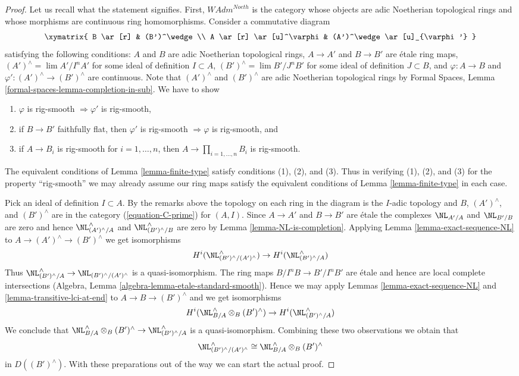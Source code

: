 \begin{proof}
Let us recall what the statement signifies. First, 
$\textit{WAdm}^{Noeth}$ is the category whose objects are
adic Noetherian topological rings and whose morphisms are
continuous ring homomorphisms. Consider a commutative diagram
$$
\xymatrix{
B \ar[r] & (B')^\wedge \\
A \ar[r] \ar[u]^\varphi & (A')^\wedge \ar[u]_{\varphi'}
}
$$
satisfying the following conditions:
$A$ and $B$ are adic Noetherian topological rings,
$A \to A'$ and $B \to B'$ are \'etale ring maps,
$(A')^\wedge = \lim A'/I^nA'$ for some ideal of definition $I \subset A$,
$(B')^\wedge = \lim B'/J^nB'$ for some ideal of definition $J \subset B$, and
$\varphi : A \to B$ and $\varphi' : (A')^\wedge \to (B')^\wedge$
are continuous. Note that $(A')^\wedge$ and $(B')^\wedge$ are
adic Noetherian topological rings by
Formal Spaces, Lemma \ref{formal-spaces-lemma-completion-in-sub}.
We have to show
\begin{enumerate}
\item $\varphi$ is rig-smooth $\Rightarrow \varphi'$ is rig-smooth,
\item if $B \to B'$ faithfully flat, then $\varphi'$ is rig-smooth
$\Rightarrow \varphi$ is rig-smooth, and
\item if $A \to B_i$ is rig-smooth for $i = 1, \ldots, n$, then
$A \to \prod_{i = 1, \ldots, n} B_i$ is rig-smooth.
\end{enumerate}
The equivalent conditions of Lemma \ref{lemma-finite-type} satisfy
conditions (1), (2), and (3).
Thus in verifying (1), (2), and (3) for the property
``rig-smooth'' we may already assume our ring maps satisfy
the equivalent conditions of Lemma \ref{lemma-finite-type}
in each case.

\medskip\noindent
Pick an ideal of definition $I \subset A$. By the remarks above
the topology on each ring in the diagram is the $I$-adic topology
and $B$, $(A')^\wedge$, and $(B')^\wedge$ are in the category
(\ref{equation-C-prime}) for $(A, I)$.
Since $A \to A'$ and $B \to B'$ are \'etale the complexes
$\NL_{A'/A}$ and $\NL_{B'/B}$ are zero and hence
$\NL_{(A')^\wedge/A}^\wedge$ and $\NL_{(B')^\wedge/B}^\wedge$
are zero by Lemma \ref{lemma-NL-is-completion}.
Applying Lemma \ref{lemma-exact-sequence-NL} to
$A \to (A')^\wedge \to (B')^\wedge$ we get isomorphisms
$$
H^i(\NL_{(B')^\wedge/(A')^\wedge}^\wedge) \to H^i(\NL_{(B')^\wedge/A}^\wedge)
$$
Thus $\NL_{(B')^\wedge/A}^\wedge \to \NL_{(B')^\wedge/(A')^\wedge}$
is a quasi-isomorphism. The ring maps $B/I^nB \to B'/I^nB'$ are \'etale
and hence are local complete intersections
(Algebra, Lemma \ref{algebra-lemma-etale-standard-smooth}).
Hence we may apply
Lemmas \ref{lemma-exact-sequence-NL} and
\ref{lemma-transitive-lci-at-end} to
$A \to B \to (B')^\wedge$ and we get isomorphisms
$$
H^i(\NL_{B/A}^\wedge \otimes_B (B')^\wedge) \to
H^i(\NL_{(B')^\wedge/A}^\wedge)
$$
We conclude that
$\NL_{B/A}^\wedge \otimes_B (B')^\wedge \to \NL_{(B')^\wedge/A}^\wedge$
is a quasi-isomorphism. Combining these two observations we obtain that
$$
\NL_{(B')^\wedge/(A')^\wedge}^\wedge \cong
\NL_{B/A}^\wedge \otimes_B (B')^\wedge
$$
in $D((B')^\wedge)$.
With these preparations out of the way we can start the actual proof.


\end{proof}
